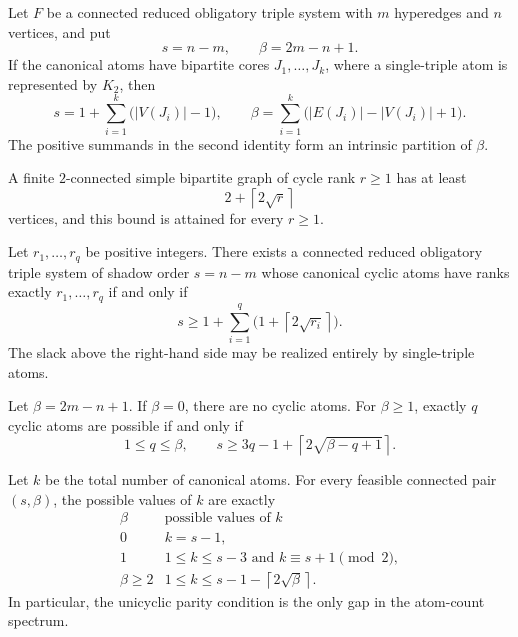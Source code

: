 
\newcommand{\rankcost}[1]{\left\lceil 2\sqrt{#1}\right\rceil}

\begin{proposition}
Let $F$ be a connected reduced obligatory triple system with $m$ hyperedges
and $n$ vertices, and put
\[
 s=n-m,
 \qquad
 \beta=2m-n+1.
\]
If the canonical atoms have bipartite cores $J_1,\dots,J_k$, where a
single-triple atom is represented by $K_2$, then
\[
 s=1+\sum_{i=1}^k\bigl(|V(J_i)|-1\bigr),
 \qquad
 \beta=\sum_{i=1}^k
 \bigl(|E(J_i)|-|V(J_i)|+1\bigr).
\]
The positive summands in the second identity form an intrinsic partition of
$\beta$.
\end{proposition}

\begin{lemma}
A finite $2$-connected simple bipartite graph of cycle rank $r\ge1$ has at
least
\[
 2+\rankcost{r}
\]
vertices, and this bound is attained for every $r\ge1$.
\end{lemma}

\begin{theorem}
Let $r_1,\dots,r_q$ be positive integers.  There exists a connected reduced
obligatory triple system of shadow order $s=n-m$ whose canonical cyclic atoms
have ranks exactly $r_1,\dots,r_q$ if and only if
\[
 s\ge 1+\sum_{i=1}^q\bigl(1+\rankcost{r_i}\bigr).
\]
The slack above the right-hand side may be realized entirely by single-triple
atoms.
\end{theorem}

\begin{corollary}
Let $\beta=2m-n+1$.  If $\beta=0$, there are no cyclic atoms.  For
$\beta\ge1$, exactly $q$ cyclic atoms are possible if and only if
\[
 1\le q\le\beta,
 \qquad
 s\ge 3q-1+\rankcost{\beta-q+1}.
\]
\end{corollary}

\begin{theorem}
Let $k$ be the total number of canonical atoms.  For every feasible connected
pair $(s,\beta)$, the possible values of $k$ are exactly
\[
\begin{array}{c|c}
\beta & \text{possible values of }k\\ \hline
0 & k=s-1,\\[2mm]
1 & 1\le k\le s-3\text{ and }k\equiv s+1\pmod 2,\\[2mm]
\beta\ge2 & 1\le k\le s-1-\rankcost{\beta}.
\end{array}
\]
In particular, the unicyclic parity condition is the only gap in the atom-count
spectrum.
\end{theorem}

